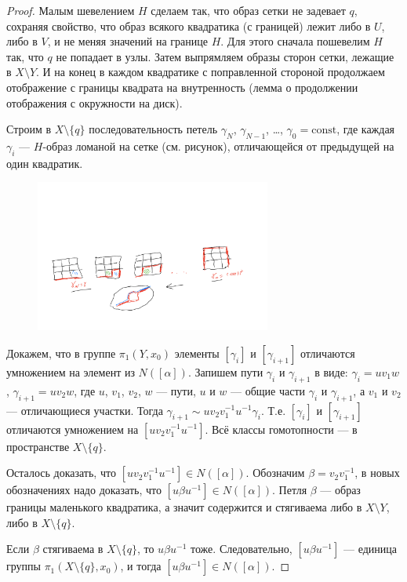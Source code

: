 \documentclass[12pt,a4paper]{article}
\newcommand{\const}{\ensuremath{\mathrm{const}}\xspace}
\begin{document}
\begin{proof}
        Малым шевелением $H$ сделаем так, что образ сетки не задевает $q$, сохраняя свойство, что образ всякого квадратика (с границей) лежит либо в $U$, либо в $V$, и не меняя значений на границе $H$. Для этого сначала пошевелим $H$ так, что $q$ не попадает в узлы. Затем выпрямляем образы сторон сетки, лежащие в $X \setminus Y$. И на конец в каждом квадратике с поправленной стороной продолжаем отображение с границы квадрата на внутренность (лемма о продолжении отображения с окружности на диск).

        Строим в $X \setminus \{q\}$ последовательность петель $\gamma_N$, $\gamma_{N-1}$, \dots, $\gamma_0 = \const$, где каждая $\gamma_i$ --- $H$-образ ломаной на сетке (см. рисунок), отличающейся от предыдущей на один квадратик.
        \begin{figure}[H]
            \centering
            \includegraphics[height=5cm]{DG-01.pdf}
        \end{figure}

        Докажем, что в группе $\pi_1(Y, x_0)$ элементы $[\gamma_i]$ и $[\gamma_{i+1}]$ отличаются умножением на элемент из $N([\alpha])$. Запишем пути $\gamma_i$ и $\gamma_{i+1}$ в виде: $\gamma_i = uv_1w$, $\gamma_{i+1} = uv_2w$, где $u$, $v_1$, $v_2$, $w$ --- пути, $u$ и $w$ --- общие части $\gamma_i$ и $\gamma_{i+1}$, а $v_1$ и $v_2$ --- отличающиеся участки. Тогда $\gamma_{i+1} \sim u v_2 v_1^{-1} u^{-1} \gamma_i$. Т.е. $[\gamma_i]$ и $[\gamma_{i+1}]$ отличаются умножением на $[u v_2 v_1^{-1} u^{-1}]$. Всё классы гомотопности --- в пространстве $X \setminus \{q\}$.
        
        Осталось доказать, что $[u v_2 v_1^{-1} u^{-1}] \in N([\alpha])$. Обозначим $\beta = v_2v_1^{-1}$, в новых обозначениях надо доказать, что $[u\beta u^{-1}] \in N([\alpha])$. Петля $\beta$ --- образ границы маленького квадратика, а значит содержится и стягиваема либо в $X \setminus Y$, либо в $X \setminus \{q\}$.

        Если $\beta$ стягиваема в $X \setminus \{q\}$, то $u\beta u^{-1}$ тоже. Следовательно, $[u \beta u^{-1}]$ --- единица группы $\pi_1(X \setminus \{q\}, x_0)$, и тогда $[u \beta u^{-1}] \in N([\alpha])$.
        

\end{proof}
\end{document}
